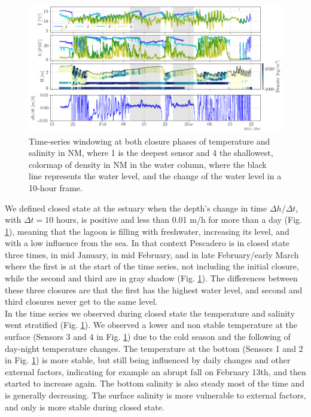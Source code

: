 \documentclass[11pt,letterpaper]{article}
\begin{document}
\begin{figure}[h!]
    \centering
    \includegraphics[scale=0.5]{Imagenes/saltemp.png}
    \caption{Time-series windowing at both closure phases of temperature and salinity in NM, where 1 is the deepest sensor and 4 the shallowest, colormap of density in NM in the water column, where the black line represents the water level, and the change of the water level in a 10-hour frame.}
    \label{fig:saltemp}
\end{figure}

We defined closed state at the estuary when the depth's change in time $\Delta h/\Delta t$, with $\Delta t=10$ hours, is positive and less than 0.01 m/h for more than a day (Fig. \ref{fig:saltemp}), meaning that the lagoon is filling with freshwater, increasing its level, and with a low influence from the sea. In that context Pescadero is in closed state three times, in mid January, in mid February, and in late February/early March where the first is at the start of the time series, not including the initial closure, while the second and third are in gray shadow (Fig. \ref{fig:saltemp}). The differences between these three closures are that the first has the highest water level, and second and third closures never get to the same level. \\

In the time series we observed during closed state the temperature and salinity went stratified (Fig. \ref{fig:saltemp}). We observed a lower and non stable temperature at the surface (Sensors 3 and 4 in Fig. \ref{fig:saltemp}) due to the cold season and the following of day-night temperature changes. The temperature at the bottom (Sensors 1 and 2 in Fig. \ref{fig:saltemp}) is more stable, but still being influenced by daily changes and other external factors, indicating for example an abrupt fall on February 13th, and then started to increase again. The bottom salinity is also steady most of the time and is generally decreasing. The surface salinity is more vulnerable to external factors, and only is more stable during closed state. \\ 
\end{document}
